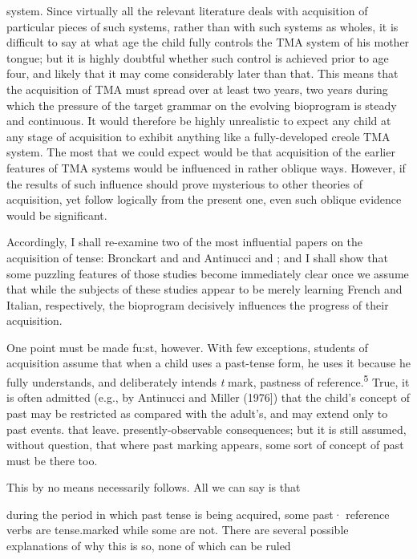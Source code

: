 system. Since virtually all the relevant literature deals with acquisition of particular pieces of such systems, rather than with such systems as wholes, it is difficult to say at what age the child fully controls the TMA system of his mother tongue; but it is highly doubtful whether such control is achieved prior to age four, and likely that it may come considerably later than that. This means that the acquisition of TMA must spread over at least two years, two years during which the pres\-sure of the target grammar on the evolving bioprogram is steady and continuous. It would therefore be highly unrealistic to expect any child at any stage of acquisition to exhibit anything like a fully-developed creole TMA system. The most that we could expect would be that acquisition of the earlier features of TMA systems would be influ\-enced in rather oblique ways. However, if the results of such influence should prove mysterious to other theories of acquisition, yet follow logically from the present one, even such oblique evidence would be significant.

Accordingly, I shall re-examine two of the most influential papers on the acquisition of tense: Bronckart and \citet{Sinclair1973} and Antinucci and \citet{Miller1976}; and I shall show that some puzzling features of those studies become immediately clear once we assume that while the subjects of these studies appear to be merely learning French and Italian, respectively, the bioprogram decisively influences the progress of their acquisition.

One point must be made fu:st, however. With few exceptions, students of acquisition assume that when a child uses a past-tense form, he uses it because he fully understands, and deliberately intends \textit{t} mark, pastness of reference.\textsuperscript{5} True, it is often admitted (e.g., by Antinucci and Miller (1976]) that the child's concept of past may be restricted as compared with the adult's, and may extend only to past events. that leave. presently-observable consequences; but it is still assumed, without question, that where past marking appears, some sort of concept of past must be there too.

This by no means necessarily follows. All we can say is that



during the period in which past tense is being acquired, some past· reference verbs are tense.marked while some are not. There are several possible explanations of why this is so, none of which can be ruled


